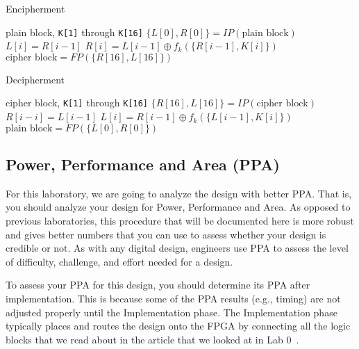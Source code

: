 \documentclass{article}
\begin{document}
\begin{algorithm}
\caption{Encipherment}\label{alg:encrypt}
\begin{algorithmic}
\Require plain block, \verb!K[1]! through \verb!K[16]!
\State $\{L[0], R[0]\} = IP(\text{plain block})$
\State $L[i] = R[i-1]$
\State $R[i] = L[i-1] \oplus f_k(\{R[i-1], K[i]\})$
\EndFor
\State $\text{cipher block} = FP(\{R[16], L[16]\})$
\end{algorithmic}
\end{algorithm}

\begin{algorithm}
\caption{Decipherment}\label{alg:decrypt}
\begin{algorithmic}
\Require cipher block, \verb!K[1]! through \verb!K[16]!
\State $\{R[16], L[16]\} = IP(\text{cipher block})$
\State $R[i-i] = L[i-1]$
\State $L[i] = R[i-1] \oplus f_k(\{L[i-1], K[i]\})$
\EndFor
\State $\text{plain block} = FP(\{L[0], R[0]\})$
\end{algorithmic}
\end{algorithm}

\subsection{Power, Performance and Area (PPA)}

For this laboratory, we are going to analyze the design with better
PPA.  That is, you should analyze your design for Power, Performance
and Area.  As opposed to previous laboratories, this procedure that
will be documented here is more robust and gives better numbers that
you can use to assess whether your design is credible or not.  As with
any digital design, engineers use PPA to assess the level of
difficulty, challenge, and effort needed for a design.

To assess your PPA for this design, you should determine its PPA after
implementation.  This is because some of the PPA results (e.g.,
timing) are not adjusted properly until the Implementation phase.  The
Implementation phase typically places and routes the design onto the
FPGA by connecting all the logic blocks that we read about in the
article that we looked at in Lab 0~\cite{7086413}.
\end{document}
